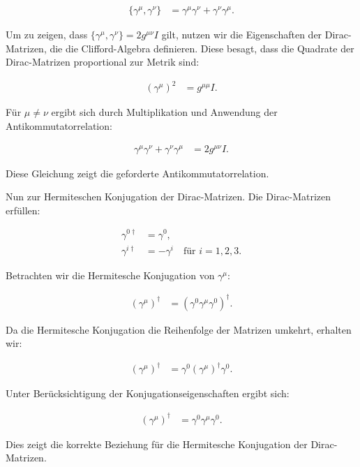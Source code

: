 \documentclass[11pt,a4paper]{article}
\begin{document}
\begin{align*}
\{\gamma^\mu, \gamma^\nu\} &= \gamma^\mu \gamma^\nu + \gamma^\nu \gamma^\mu.
\end{align*}

Um zu zeigen, dass \(\{\gamma^\mu, \gamma^\nu\} = 2 g^{\mu \nu} I\) gilt, nutzen wir die Eigenschaften der Dirac-Matrizen, die die Clifford-Algebra definieren. Diese besagt, dass die Quadrate der Dirac-Matrizen proportional zur Metrik sind:

\begin{align*}
(\gamma^\mu)^2 &= g^{\mu \mu} I.
\end{align*}

Für \(\mu \neq \nu\) ergibt sich durch Multiplikation und Anwendung der Antikommutatorrelation:

\begin{align*}
\gamma^\mu \gamma^\nu + \gamma^\nu \gamma^\mu &= 2 g^{\mu \nu} I.
\end{align*}

Diese Gleichung zeigt die geforderte Antikommutatorrelation.

Nun zur Hermiteschen Konjugation der Dirac-Matrizen. Die Dirac-Matrizen erfüllen:

\begin{align*}
\gamma^{0 \dagger} &= \gamma^0, \\
\gamma^{i \dagger} &= -\gamma^i \quad \text{für } i = 1, 2, 3.
\end{align*}

Betrachten wir die Hermitesche Konjugation von \(\gamma^\mu\):

\begin{align*}
(\gamma^\mu)^\dagger &= (\gamma^0 \gamma^\mu \gamma^0)^\dagger.
\end{align*}

Da die Hermitesche Konjugation die Reihenfolge der Matrizen umkehrt, erhalten wir:

\begin{align*}
(\gamma^\mu)^\dagger &= \gamma^0 (\gamma^\mu)^\dagger \gamma^0.
\end{align*}

Unter Berücksichtigung der Konjugationseigenschaften ergibt sich:

\begin{align*}
(\gamma^\mu)^\dagger &= \gamma^0 \gamma^\mu \gamma^0.
\end{align*}

Dies zeigt die korrekte Beziehung für die Hermitesche Konjugation der Dirac-Matrizen.
\end{document}
